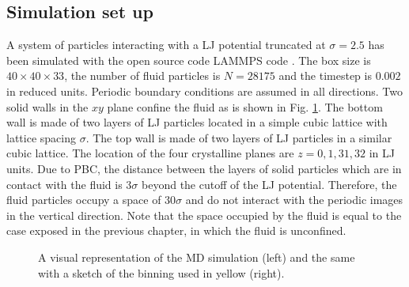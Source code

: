 \documentclass[b5paper,openright,10pt]{book}
\begin{document}
\subsection{Simulation set up}
A system of particles interacting  with a LJ potential 
truncated at $\sigma=2.5$ has been simulated with the open source code LAMMPS code \cite{Plimpton1995}. The
box size  is $40\times40\times33$,  the number  of fluid  particles is
$N=28175$ and  the timestep  is $0.002$ in reduced  units.  Periodic
boundary conditions are assumed  in all directions.   Two solid
walls in the $xy$ plane confine the fluid as is shown in Fig. \ref{fig:WallsBox}.  The bottom wall is made of
two layers  of LJ  particles located  in a  simple cubic  lattice with
lattice spacing  $\sigma$. The top  wall is made  of two layers  of LJ
particles  in a  similar  cubic  lattice.  The  location  of the  four
crystalline planes  are $z=0,1,31,32$  in LJ units.   Due to  PBC, the
distance between  the layers of  solid particles which are  in contact
with   the  fluid   is  $3\sigma$   beyond  the   cutoff  of   the  LJ
potential. Therefore, the fluid particles occupy a space of $30\sigma$
and  do  not  interact  with  the  periodic  images  in  the  vertical
direction. Note that the space occupied by the fluid is equal to the case exposed in the previous chapter, in which the fluid is unconfined. 
\begin{figure}
    \centering
    \caption[Visual representation of the MD simulation of a confined fluid between two solid slabs]{A visual representation of the MD simulation (left) and the same with a sketch of the binning used in yellow (right).}
    \label{fig:WallsBox}
\end{figure}
\end{document}
